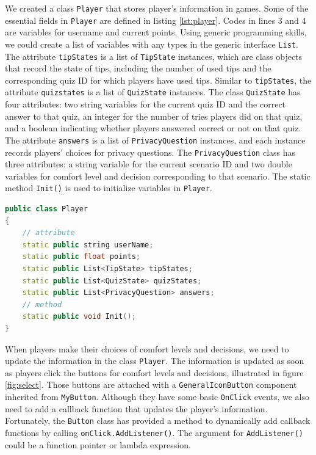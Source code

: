 \documentclass[msc,deptreport,ai]{infthesis}      %
\begin{document}
We created a class \texttt{Player} that stores player's information in games. Some of the essential fields in \texttt{Player} are defined in listing \ref{lst:player}. Codes in lines 3 and 4 are variables for username and current points. Using generic programming skills, we could create a list of variables with any types in the generic interface \texttt{List}. The attribute \texttt{tipStates} is a list of \texttt{TipState} instances, which are class objects that record the state of tips, including the number of used tips and the corresponding quiz ID for which players have used tips. Similar to \texttt{tipStates}, the attribute \texttt{quizstates} is a list of \texttt{QuizState} instances. The class \texttt{QuizState} has four attributes: two string variables for the current quiz ID and the correct answer to that quiz, an integer for the number of tries players did on that quiz, and a boolean indicating whether players answered correct or not on that quiz. The attribute \texttt{answers} is a list of \texttt{PrivacyQuestion} instances, and each instance records players' choices for privacy questions. The \texttt{PrivacyQuestion} class has three attributes: a string variable for the current scenario ID and two double variables for comfort level and decision corresponding to that scenario. The static method \texttt{Init()} is used to initialize variables in \texttt{Player}.

\begin{lstlisting}[caption={\texttt{Player} class fields },label={lst:player},language=C++]
public class Player
{
    // attribute
    static public string userName;
    static public float points;
    static public List<TipState> tipStates;
    static public List<QuizState> quizStates;
    static public List<PrivacyQuestion> answers;
    // method
    static public void Init();
}
\end{lstlisting}

When players make their choices of comfort levels and decisions, we need to update the information in the class \texttt{Player}. The information is updated as soon as players click the buttons for comfort levels and decisions, illustrated in figure \ref{fig:select}. Those buttons are attached with a \texttt{GeneralIconButton} component inherited from \texttt{MyButton}. Although they have some basic \texttt{OnClick} events, we also need to add a callback function that updates the player's information. Fortunately, the \texttt{Button} class has provided a method to dynamically add callback functions by calling \texttt{onClick.AddListener()}. The argument for \texttt{AddListener()} could be a function pointer or lambda expression.
\end{document}

